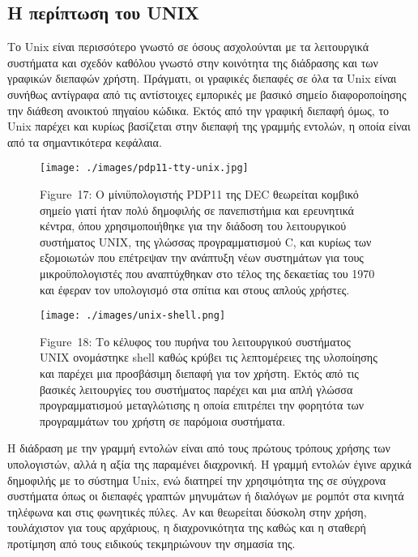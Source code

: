 \documentclass[
]{article}
\begin{document}
\hypertarget{ux3b7-ux3c0ux3b5ux3c1ux3afux3c0ux3c4ux3c9ux3c3ux3b7-ux3c4ux3bfux3c5-unix}{%
\subsection{Η περίπτωση του
UNIX}\label{ux3b7-ux3c0ux3b5ux3c1ux3afux3c0ux3c4ux3c9ux3c3ux3b7-ux3c4ux3bfux3c5-unix}}

Το Unix είναι περισσότερο γνωστό σε όσους ασχολούνται με τα λειτουργικά
συστήματα και σχεδόν καθόλου γνωστό στην κοινότητα της διάδρασης και των
γραφικών διεπαφών χρήστη. Πράγματι, οι γραφικές διεπαφές σε όλα τα Unix
είναι συνήθως αντίγραφα από τις αντίστοιχες εμπορικές με βασικό σημείο
διαφοροποίησης την διάθεση ανοικτού πηγαίου κώδικα. Εκτός από την
γραφική διεπαφή όμως, το Unix παρέχει και κυρίως βασίζεται στην διεπαφή
της γραμμής εντολών, η οποία είναι από τα σημαντικότερα κεφάλαια.

\leavevmode{}%
\begin{figure}
\hypertarget{fig:pdp11-tty-unix}{%
\centering
\texttt{[image: ./images/pdp11-tty-unix.jpg]}
\caption{Figure~17: Ο μίνιϋπολογιστής PDP11 της DEC θεωρείται κομβικό
σημείο γιατί ήταν πολύ δημοφιλής σε πανεπιστήμια και ερευνητικά κέντρα,
όπου χρησιμοποιήθηκε για την διάδοση του λειτουργικού συστήματος UNIX,
της γλώσσας προγραμματισμού C, και κυρίως των εξομοιωτών που επέτρεψαν
την ανάπτυξη νέων συστημάτων για τους μικροϋπολογιστές που αναπτύχθηκαν
στο τέλος της δεκαετίας του 1970 και έφεραν τον υπολογισμό στα σπίτια
και στους απλούς χρήστες.}\label{fig:pdp11-tty-unix}
}
\end{figure}

\leavevmode{}%
\begin{figure}
\hypertarget{fig:unix-shell}{%
\centering
\texttt{[image: ./images/unix-shell.png]}
\caption{Figure~18: Το κέλυφος του πυρήνα του λειτουργικού συστήματος
UNIX ονομάστηκε shell καθώς κρύβει τις λεπτομέρειες της υλοποίησης και
παρέχει μια προσβάσιμη διεπαφή για τον χρήστη. Εκτός από τις βασικές
λειτουργίες του συστήματος παρέχει και μια απλή γλώσσα προγραμματισμού
μεταγλώτισης η οποία επιτρέπει την φορητότα των προγραμμάτων του χρήστη
σε παρόμοια συστήματα.}\label{fig:unix-shell}
}
\end{figure}

Η διάδραση με την γραμμή εντολών είναι από τους πρώτους τρόπους χρήσης
των υπολογιστών, αλλά η αξία της παραμένει διαχρονική. Η γραμμή εντολών
έγινε αρχικά δημοφιλής με το σύστημα Unix, ενώ διατηρεί την χρησιμότητα
της σε σύγχρονα συστήματα όπως οι διεπαφές γραπτών μηνυμάτων ή διαλόγων
με ρομπότ στα κινητά τηλέφωνα και στις φωνητικές πύλες. Αν και θεωρείται
δύσκολη στην χρήση, τουλάχιστον για τους αρχάριους, η διαχρονικότητα της
καθώς και η σταθερή προτίμηση από τους ειδικούς τεκμηριώνουν την σημασία
της.
\end{document}
